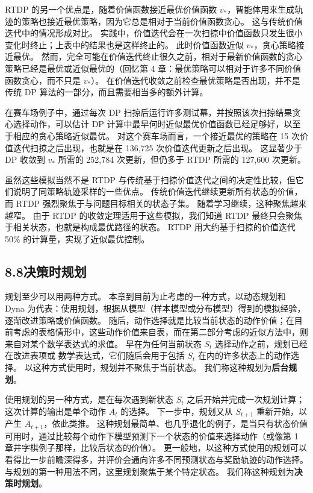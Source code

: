 \documentclass[UTF8,12pt,a4paper,fontset=fandol]{ctexart}
\begin{document}
RTDP 的另一个优点是，随着价值函数接近最优价值函数 $v_*$，智能体用来生成轨迹的策略也接近最优策略，因为它总是相对于当前价值函数贪心。
这与传统价值迭代中的情况形成对比。
实践中，价值迭代会在一次扫掠中价值函数只发生很小变化时终止；上表中的结果也是这样终止的。
此时价值函数近似 $v_*$，贪心策略接近最优。
然而，完全可能在价值迭代终止很久之前，相对于最新价值函数的贪心策略已经是最优或近似最优的（回忆第 4 章：最优策略可以相对于许多不同价值函数贪心，而不只是 $v_*$）。
在价值迭代收敛之前检查最优策略是否出现，并不是传统 DP 算法的一部分，而且需要相当多的额外计算。

在赛车场例子中，通过每次 DP 扫掠后运行许多测试幕，并按照该次扫掠结果贪心选择动作，可以估计 DP 计算中最早何时近似最优价值函数已经足够好，以至于相应的贪心策略近似最优。
对这个赛车场而言，一个接近最优的策略在 15 次价值迭代扫掠之后出现，也就是在 136,725 次价值迭代更新之后出现。
这显著少于 DP 收敛到 $v_*$ 所需的 252,784 次更新，但仍多于 RTDP 所需的 127,600 次更新。

虽然这些模拟当然不是 RTDP 与传统基于扫掠价值迭代之间的决定性比较，但它们说明了同策略轨迹采样的一些优点。
传统价值迭代继续更新所有状态的价值，而 RTDP 强烈聚焦于与问题目标相关的状态子集。
随着学习继续，这种聚焦越来越窄。
由于 RTDP 的收敛定理适用于这些模拟，我们知道 RTDP 最终只会聚焦于相关状态，也就是构成最优路径的状态。
RTDP 用大约基于扫掠的价值迭代 50\% 的计算量，实现了近似最优控制。

\subsection*{8.8\quad 决策时规划}

规划至少可以用两种方式。
本章到目前为止考虑的一种方式，以动态规划和 Dyna 为代表：使用规划，根据从模型（样本模型或分布模型）得到的模拟经验，逐渐改进策略或价值函数。
随后，动作选择就是比较当前状态的动作价值；在目前考虑的表格情形中，这些动作价值来自表，而在第二部分考虑的近似方法中，则来自对某个数学表达式的求值。
早在为任何当前状态 $S_t$ 选择动作之前，规划已经在改进表项或
数学表达式，它们随后会用于包括 $S_t$ 在内的许多状态上的动作选择。
以这种方式使用时，规划并不聚焦于当前状态。
我们称这种规划为\textbf{后台规划}。

使用规划的另一种方式，是在每次遇到新状态 $S_t$ 之后开始并完成一次规划计算；这次计算的输出是单个动作 $A_t$ 的选择。
下一步中，规划又从 $S_{t+1}$ 重新开始，以产生 $A_{t+1}$，依此类推。
这种规划最简单、也几乎退化的例子，是当只有状态价值可用时，通过比较每个动作下模型预测下一个状态的价值来选择动作（或像第 1 章井字棋例子那样，比较后状态的价值）。
更一般地，以这种方式使用的规划可以看得比一步前瞻深得多，并评价会通向许多不同预测状态与奖励轨迹的动作选择。
与规划的第一种用法不同，这里规划聚焦于某个特定状态。
我们称这种规划为\textbf{决策时规划}。
\end{document}
